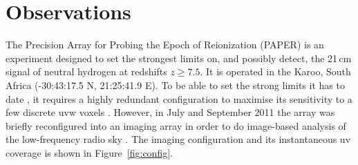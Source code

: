 \documentclass[useAMS,usenatbib]{mn2e}
\begin{document}
\section{Observations}
\label{sec:obs}

The Precision Array for Probing the Epoch of Reionization (PAPER) is an experiment designed to set the strongest limits on, and possibly detect, the 21\,cm signal of neutral hydrogen at redshifts $z \geq 7.5$. It is operated in the Karoo, South Africa (-30:43:17.5 N, 21:25:41.9 E). To be able to set the strong limits it has to date \citep[][Cheng et al. in prep., Kohn et al. in prep.?]{Parsons.14, Jacobs.14, Ali.15, Moore.15}, it requires a highly redundant configuration to maximise its sensitivity to a few discrete uvw voxels \citep[e.g.][]{Parsons.12}. However, in July and September 2011 the array was briefly reconfigured into an imaging array in order to do image-based analysis of the low-frequency radio sky \citep[e.g.][]{Stefan.13}. The imaging configuration and its instantaneous uv coverage is shown in Figure~\ref{fig:config}.
\end{document}
